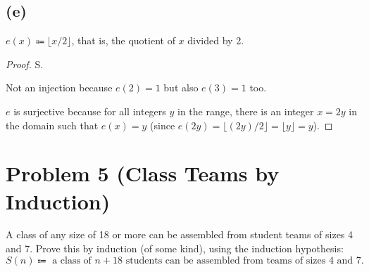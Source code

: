 \documentclass[14pt]{extarticle}
\begin{document}
\subsection{(e)}
$e(x) \Coloneqq \lfloor x/2\rfloor$, that is, the quotient of $x$ divided by 2.
\begin{proof}
S.

Not an injection because $e(2) = 1$ but also $e(3) = 1$ too.

$e$ is surjective because for all integers $y$ in the range, there is an integer $x = 2y$ in the domain such that $e(x) = y$ (since $e(2y) = \lfloor (2y)/2 \rfloor = \lfloor y \rfloor = y$).
\end{proof}

\section{Problem 5 (Class Teams by Induction)}
A class of any size of 18 or more can be assembled from student teams of sizes 4 and 7. Prove this by induction (of some kind), using the induction hypothesis:
$$
S(n) \Coloneqq \text{ a class of $n + 18$ students can be assembled from teams of sizes 4 and 7.}
$$
\end{document}
